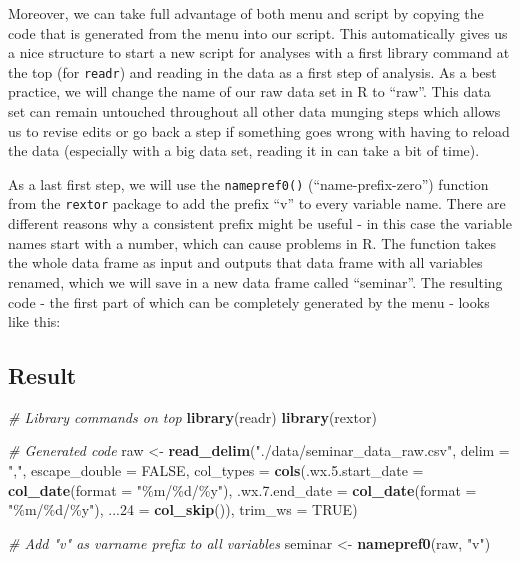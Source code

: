 \documentclass[
]{book}
\newenvironment{Shaded}{\begin{snugshade}}{\end{snugshade}}
\newcommand{\AttributeTok}[1]{\textcolor[rgb]{0.13,0.29,0.53}{#1}}
\newcommand{\CommentTok}[1]{\textcolor[rgb]{0.56,0.35,0.01}{\textit{#1}}}
\newcommand{\ConstantTok}[1]{\textcolor[rgb]{0.56,0.35,0.01}{#1}}
\newcommand{\FunctionTok}[1]{\textcolor[rgb]{0.13,0.29,0.53}{\textbf{#1}}}
\newcommand{\NormalTok}[1]{#1}
\newcommand{\OtherTok}[1]{\textcolor[rgb]{0.56,0.35,0.01}{#1}}
\newcommand{\StringTok}[1]{\textcolor[rgb]{0.31,0.60,0.02}{#1}}
\begin{document}
Moreover, we can take full advantage of both menu and script by copying the code that is generated from the menu into our script.
This automatically gives us a nice structure to start a new script for analyses with a first library command at the top (for \texttt{readr}) and reading in the data as a first step of analysis.
As a best practice, we will change the name of our raw data set in R to ``raw''.
This data set can remain untouched throughout all other data munging steps which allows us to revise edits or go back a step if something goes wrong with having to reload the data (especially with a big data set, reading it in can take a bit of time).

As a last first step, we will use the \texttt{namepref0()} (``name-prefix-zero'') function from the \texttt{rextor} package to add the prefix ``v'' to every variable name.
There are different reasons why a consistent prefix might be useful - in this case the variable names start with a number, which can cause problems in R.
The function takes the whole data frame as input and outputs that data frame with all variables renamed, which we will save in a new data frame called ``seminar''.
The resulting code - the first part of which can be completely generated by the menu - looks like this:

\subsection*{Result}\label{result}

\begin{Shaded}
\begin{Highlighting}[]
\CommentTok{\# Library commands on top}
\FunctionTok{library}\NormalTok{(readr)}
\FunctionTok{library}\NormalTok{(rextor)}

\CommentTok{\# Generated code}
\NormalTok{raw }\OtherTok{\textless{}{-}} \FunctionTok{read\_delim}\NormalTok{(}\StringTok{"./data/seminar\_data\_raw.csv"}\NormalTok{, }
    \AttributeTok{delim =} \StringTok{","}\NormalTok{, }\AttributeTok{escape\_double =} \ConstantTok{FALSE}\NormalTok{, }
    \AttributeTok{col\_types =} \FunctionTok{cols}\NormalTok{(}\AttributeTok{.wx.5.start\_date =} \FunctionTok{col\_date}\NormalTok{(}\AttributeTok{format =} \StringTok{"\%m/\%d/\%y"}\NormalTok{),}
                     \AttributeTok{.wx.7.end\_date =} \FunctionTok{col\_date}\NormalTok{(}\AttributeTok{format =} \StringTok{"\%m/\%d/\%y"}\NormalTok{), }
                     \AttributeTok{...24 =} \FunctionTok{col\_skip}\NormalTok{()),}
    \AttributeTok{trim\_ws =} \ConstantTok{TRUE}\NormalTok{)}

\CommentTok{\# Add "v" as varname prefix to all variables}
\NormalTok{seminar }\OtherTok{\textless{}{-}} \FunctionTok{namepref0}\NormalTok{(raw, }\StringTok{"v"}\NormalTok{)}
\end{Highlighting}
\end{Shaded}
\end{document}
